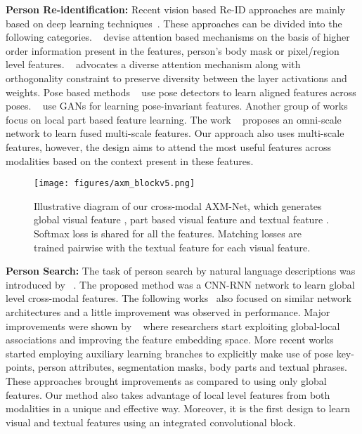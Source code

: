 \documentclass[10pt,twocolumn,letterpaper]{article}
\begin{document}
\noindent\textbf{Person Re-identification: }
Recent vision based Re-ID approaches are mainly based on deep learning techniques~\cite{quan2019auto,li2019global,wang2019spatial,dai2019batch,zhou2019omni,fu2019horizontal,sun2018beyond}. These approaches can be divided into the following categories. ~\cite{xu2018attention,Xia_2019_ICCV,Chen_2019_ICCV,li2018harmonious,song2018mask,cai2019multi} devise attention based mechanisms on the basis of higher order information present in the features, person's body mask or pixel/region level features. ~\cite{Chen_2019_ABD} advocates a diverse attention mechanism along with orthogonality constraint to preserve diversity between the layer activations and weights. Pose based methods ~\cite{jing2018pose,Miao_2019_pose} use pose detectors to learn aligned features across poses. ~\cite{liu2018pose,ge2018fd} use GANs for learning pose-invariant features. Another group of works~\cite{sun2018beyond,wei2018glad, li2017learning} focus on local part based feature learning. The work ~\cite{zhou2019omni} proposes an omni-scale network to learn fused multi-scale features. Our approach also uses multi-scale features, however, the design aims to attend the most useful features across modalities based on the context present in these features.

\begin{figure*}
\centering
        \texttt{[image: figures/axm\_blockv5.png]}
        \footnotesize{\caption{Illustrative diagram of our cross-modal AXM-Net, which generates global visual feature , part based visual feature  and textual feature . Softmax loss  is shared for all the features. Matching losses are trained pairwise with the textual feature for each visual feature.}
    \label{block-diagram}}
\end{figure*}

\noindent\textbf{Person Search: }The task of person search by natural language descriptions was introduced by ~\cite{li2017person}. The proposed method was a CNN-RNN network to learn global level cross-modal features. The following works~\cite{li2017identity,chen2018Pwm} also focused on similar network architectures and a little improvement was observed in performance. Major improvements were shown by ~\cite{chen2018improving,zhang2018deep,zheng2020dual} where researchers start exploiting global-local associations and improving the feature embedding space. More recent works  ~\cite{jing2018pose,wang2020img,wang2020vitaa,aggarwal2020text} started employing auxiliary learning branches to explicitly make use of pose key-points, person attributes, segmentation masks, body parts and textual phrases. These approaches brought improvements as compared to using only global features. Our method also takes advantage of local level features from both modalities in a unique and effective way. Moreover, it is the first design to learn visual and textual features using an integrated convolutional block. 
\end{document}
